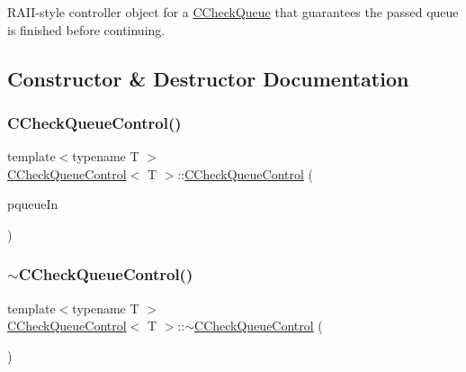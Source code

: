 R\+A\+I\+I-\/style controller object for a \mbox{\hyperlink{class_c_check_queue}{C\+Check\+Queue}} that guarantees the passed queue is finished before continuing. 

\subsection{Constructor \& Destructor Documentation}
\mbox{\label{class_c_check_queue_control_ae690afca20574a7c98e0c5e82011c606}} 
\subsubsection{\texorpdfstring{C\+Check\+Queue\+Control()}{CCheckQueueControl()}}
{\footnotesize\ttfamily template$<$typename T $>$ \\
\mbox{\hyperlink{class_c_check_queue_control}{C\+Check\+Queue\+Control}}$<$ T $>$\+::\mbox{\hyperlink{class_c_check_queue_control}{C\+Check\+Queue\+Control}} (\begin{DoxyParamCaption}\item[{\mbox{\hyperlink{class_c_check_queue}{C\+Check\+Queue}}$<$ T $>$ $\ast$}]{pqueue\+In }\end{DoxyParamCaption})\hspace{0.3cm}{\ttfamily [inline]}}

\mbox{\label{class_c_check_queue_control_afc8a9f044b4559a04ff3569cff5d2f94}} 
\subsubsection{\texorpdfstring{$\sim$\+C\+Check\+Queue\+Control()}{~CCheckQueueControl()}}
{\footnotesize\ttfamily template$<$typename T $>$ \\
\mbox{\hyperlink{class_c_check_queue_control}{C\+Check\+Queue\+Control}}$<$ T $>$\+::$\sim$\mbox{\hyperlink{class_c_check_queue_control}{C\+Check\+Queue\+Control}} (\begin{DoxyParamCaption}{ }\end{DoxyParamCaption})\hspace{0.3cm}{\ttfamily [inline]}}




